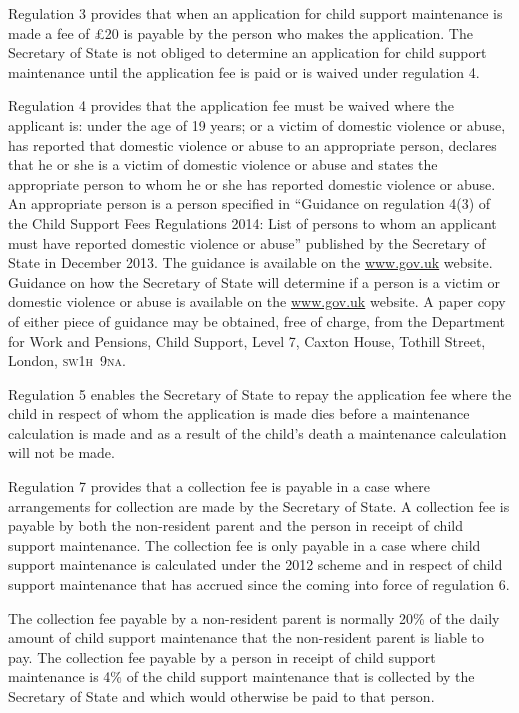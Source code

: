 \documentclass[12pt,a4paper]{article}
\begin{document}
Regulation 3 provides that when an application for child support maintenance is made a fee of £20 is payable by the person who makes the application. The Secretary of State is not obliged to determine an application for child support maintenance until the application fee is paid or is waived under regulation 4.

Regulation 4 provides that the application fee must be waived where the applicant is: under the age of 19 years; or a victim of domestic violence or abuse, has reported that domestic violence or abuse to an appropriate person, declares that he or she is a victim of domestic violence or abuse and states the appropriate person to whom he or she has reported domestic violence or abuse. An appropriate person is a person specified in “Guidance on regulation 4(3) of the Child Support Fees Regulations 2014: List of persons to whom an applicant must have reported domestic violence or abuse” published by the Secretary of State in December 2013. The guidance is available on the \url{www.gov.uk} website. Guidance on how the Secretary of State will determine if a person is a victim or domestic violence or abuse is available on the \url{www.gov.uk} website. A paper copy of either piece of guidance may be obtained, free of charge, from the Department for Work and Pensions, Child Support, Level 7, Caxton House, Tothill Street, London, \textsc{\lowercase{SW1H~9NA}}.

Regulation 5 enables the Secretary of State to repay the application fee where the child in respect of whom the application is made dies before a maintenance calculation is made and as a result of the child’s death a maintenance calculation will not be made.

Regulation 7 provides that a collection fee is payable in a case where arrangements for collection are made by the Secretary of State. A collection fee is payable by both the non-resident parent and the person in receipt of child support maintenance. The collection fee is only payable in a case where child support maintenance is calculated under the 2012 scheme and in respect of child support maintenance that has accrued since the coming into force of regulation 6.

The collection fee payable by a non-resident parent is normally 20\% of the daily amount of child support maintenance that the non-resident parent is liable to pay. The collection fee payable by a person in receipt of child support maintenance is 4\% of the child support maintenance that is collected by the Secretary of State and which would otherwise be paid to that person.
\end{document}
